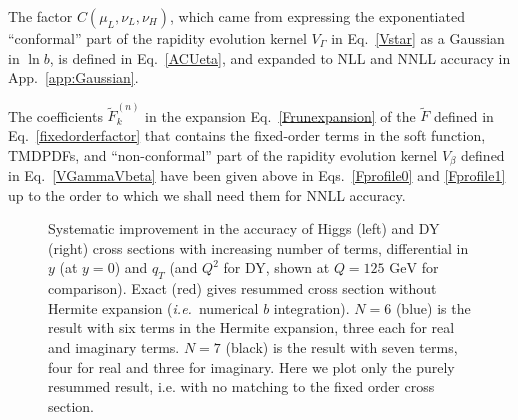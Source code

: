 \documentclass[a4,letterpaper,11pt]{article}
\newcommand{\ie}{\emph{i.e.}~}
\newcommand{\wt}{\widetilde}
\newcommand{\eq}[1]{Eq.~\eqref{#1}}
\newcommand{\eqs}[2]{Eqs.~\eqref{#1} and \eqref{#2}}
\newcommand{\appx}[1]{App.~\ref{app:#1}}
\begin{document}
The factor $C(\mu_L,\nu_L,\nu_H)$, which came from expressing the exponentiated ``conformal'' part of the rapidity evolution kernel $V_\Gamma$ in \eq{Vstar} as a Gaussian in $\ln b$, is defined in \eq{ACUeta}, and expanded to NLL and NNLL accuracy in \appx{Gaussian}.

The coefficients $\wt F^{(n)}_k$ in the expansion \eq{Frunexpansion} of the $\wt F$ defined in \eq{fixedorderfactor} that contains the fixed-order terms in the soft function, TMDPDFs, and ``non-conformal'' part of the rapidity evolution kernel $V_\beta$ defined in \eq{VGammaVbeta} have been given above in \eqs{Fprofile0}{Fprofile1} up to the order to which we shall need them for NNLL accuracy.


\begin{figure}
\centerline{}
\vskip-0.5cm
\caption[1]{Systematic improvement in the accuracy of Higgs (left) and DY (right) cross sections with increasing number of terms, differential in $y$ (at $y=0$) and $q_T$ (and $Q^2$ for DY, shown at $Q = 125\text{ GeV}$ for comparison). Exact (red) gives resummed cross section without Hermite expansion (\ie numerical $b$ integration). $N=6$ (blue) is the result with six terms in the Hermite expansion, three each for real and imaginary terms. $N=7$ (black) is the result with seven terms, four for real and three for imaginary. Here we plot only the purely resummed result, i.e. with no matching to the fixed order cross section.}
\label{fig:Hcompare} 
\end{figure}
\end{document}
